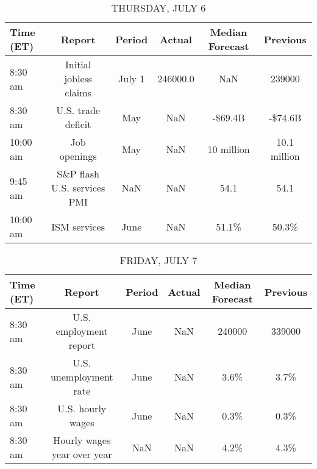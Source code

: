 \documentclass{article}%
\begin{document}
%


\begin{table}[htbp]%
\caption{THURSDAY, JULY 6}%
\centering%
\begin{adjustbox}{width=1\textwidth}%
\begin{tabular}{lccccc}
\toprule
Time (ET) &                      Report & Period &    Actual & Median Forecast &     Previous \\
\midrule
  8:30 am &      Initial jobless claims & July 1 &  246000.0 &             NaN &       239000 \\
  8:30 am &          U.S. trade deficit &    May &       NaN &         -\$69.4B &      -\$74.6B \\
 10:00 am &                Job openings &    May &       NaN &      10 million & 10.1 million \\
  9:45 am & S\&P flash U.S. services PMI &    NaN &       NaN &            54.1 &         54.1 \\
 10:00 am &                ISM services &   June &       NaN &           51.1\% &        50.3\% \\
\bottomrule
\end{tabular}
%
\end{adjustbox}%
\end{table}

%


\begin{table}[htbp]%
\caption{FRIDAY, JULY 7}%
\centering%
\begin{adjustbox}{width=1\textwidth}%
\begin{tabular}{lccccc}
\toprule
Time (ET) &                      Report & Period & Actual & Median Forecast & Previous \\
\midrule
  8:30 am &      U.S. employment report &   June &    NaN &          240000 &   339000 \\
  8:30 am &      U.S. unemployment rate &   June &    NaN &            3.6\% &     3.7\% \\
  8:30 am &           U.S. hourly wages &   June &    NaN &            0.3\% &     0.3\% \\
  8:30 am & Hourly wages year over year &    NaN &    NaN &            4.2\% &     4.3\% \\
\bottomrule
\end{tabular}
%
\end{adjustbox}%
\end{table}
\end{document}
